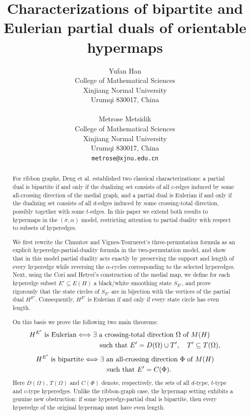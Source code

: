 \documentclass{article}
\title{Characterizations of bipartite and Eulerian partial duals of orientable hypermaps}
\author{
 Yufan Han \\
  College of Mathematical Sciences\\
  Xinjiang Normal University\\
  Urumqi 830017, China \\
  \texttt{} \\
   \And
 Metrose Metsidik \\
  College of Mathematical Sciences\\
  Xinjiang Normal University\\
  Urumqi 830017, China \\
  \texttt{metrose@xjnu.edu.cn} \\
}
\begin{document}
\maketitle
\begin{abstract}
For ribbon graphs, Deng et al. established two classical characterizations: a partial dual is bipartite if and only if the dualizing set consists of all $c$-edges induced by some all-crossing direction of the medial graph, and a partial dual is Eulerian if and only if the dualizing set consists of all $d$-edges induced by some crossing-total direction, possibly together with some $t$-edges. In this paper we extend both results to hypermaps in the $(\sigma,\alpha)$ model, restricting attention to partial duality with respect to subsets of hyperedges.

We first rewrite the Chmutov and Vignes-Tourneret's three-permutation formula as an explicit hyperedge-partial-duality formula in the two-permutation model, and show that in this model partial duality acts exactly by preserving the support and length of every hyperedge while reversing the $\alpha$-cycles corresponding to the selected hyperedges. Next, using the Cori and Hetyei's construction of the medial map, we define for each hyperedge subset $E'\subseteq E(H)$ a black/white smoothing state $S_{E'}$, and prove rigorously that the state circles of $S_{E'}$ are in bijection with the vertices of the partial dual $H^{E'}$. Consequently, $H^{E'}$ is Eulerian if and only if every state circle has even length.

On this basis we prove the following two main theorems:
\[
\begin{aligned}
H^{E'}\text{ is Eulerian}
&\Longleftrightarrow
\exists\text{ a crossing-total direction $\Omega$ of }M(H) \\
&\hspace{3.35em}\text{such that } E'=D(\Omega)\cup T',\quad T'\subseteq T(\Omega),
\end{aligned}
\]
\[
\begin{aligned}
H^{E'}\text{ is bipartite}
&\Longleftrightarrow
\exists\text{ an all-crossing direction $\Phi$ of }M(H) \\
&\hspace{3.35em}\text{such that } E'=C(\Phi).
\end{aligned}
\]
Here $D(\Omega)$, $T(\Omega)$ and $C(\Phi)$ denote, respectively, the sets of all $d$-type, $t$-type and $c$-type hyperedges. Unlike the ribbon-graph case, the hypermap setting exhibits a genuine new obstruction: if some hyperedge-partial dual is bipartite, then every hyperedge of the original hypermap must have even length.
\end{abstract}
\end{document}
